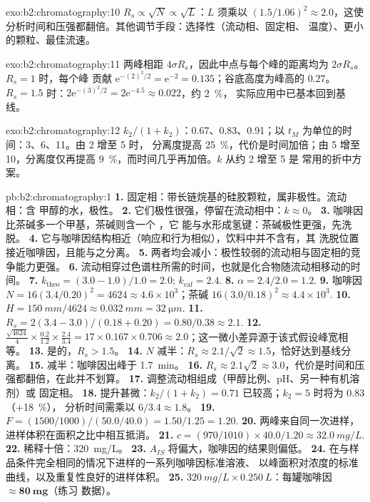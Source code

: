 \begin{solution}{exo:b2:chromatography:10}
$R_s \propto \sqrt N \propto \sqrt L$：$L$ 须乘以 $(1.5/1.06)^2 \approx 2.0$，这使
分析时间和压强都翻倍。其他调节手段：选择性（流动相、固定相、
温度）、更小的颗粒、最佳流速。
\end{solution}

\begin{solution}{exo:b2:chromatography:11}
两峰相距 $4\sigma R_s$，因此中点与每个峰的距离均为 $2\sigma R_s$。$R_s = 1$ 时，每个峰
贡献 $\mathrm e^{-(2)^2/2} = \mathrm e^{-2} = 0.135$；谷底高度为峰高的 $0.27$。
$R_s = 1.5$ 时：$2\mathrm e^{-(3)^2/2} = 2\mathrm e^{-4.5} \approx 0.022$，约 2~\%，
实际应用中已基本回到基线。
\end{solution}

\begin{solution}{exo:b2:chromatography:12}
$k_2/(1+k_2)$：0.67、0.83、0.91；以 $t_M$ 为单位的时间：3、6、11。由 2 增至 5 时，
分离度提高 25~\%，代价是时间加倍；由 5 增至 10，分离度仅再提高 9~\%，而时间几乎再加倍。$k$ 从约 2 增至 5 是
常用的折中方案。
\end{solution}

\begin{solution}{pb:b2:chromatography:1}
\textbf{1.} 固定相：带长链烷基的硅胶颗粒，属非极性。流动相：含
甲醇的水，极性。
\textbf{2.} 它们极性很强，停留在流动相中：$k \approx 0$。
\textbf{3.} 咖啡因比茶碱多一个甲基，茶碱则含一个 ，它
能与水形成氢键：茶碱极性更强，先洗脱。
\textbf{4.} 它与咖啡因结构相近（响应和行为相似），饮料中并不含有，其
洗脱位置接近咖啡因，且能与之分离。
\textbf{5.} 两者均会减小：极性较弱的流动相与固定相的竞争能力更强。
\textbf{6.} 流动相穿过色谱柱所需的时间，也就是化合物随流动相移动的时间。
\textbf{7.} $k_{\mathrm{theo}} = (3.0 - 1.0)/1.0 = 2.0$; $k_{\mathrm{caf}} = 2.4$.
\textbf{8.} $\alpha = 2.4/2.0 = 1.2$.
\textbf{9.} 咖啡因 $N = 16(3.4/0.20)^2 = 4624 \approx 4.6 \times 10^3$；茶碱 $16(3.0/0.18)^2
\approx 4.4 \times 10^3$.
\textbf{10.} $H = \qty{150}{mm}/4624 \approx \qty{0.032}{mm} = \qty{32}{\micro m}$.
\textbf{11.} $R_s = 2(3.4 - 3.0)/(0.18 + 0.20) = 0.80/0.38 \approx 2.1$.
\textbf{12.} $\frac{\sqrt{4624}}{4} \times \frac{0.2}{1.2} \times \frac{2.4}{3.4} = 17 \times 0.167 \times
0.706 \approx 2.0$；这一微小差异源于该式假设峰宽相等。
\textbf{13.} 是的，$R_s > 1.5$。
\textbf{14.} $N$ 减半：$R_s \approx 2.1/\sqrt2 \approx 1.5$，恰好达到基线分离。
\textbf{15.} 减半：咖啡因出峰于 \qty{1.7}{min}。
\textbf{16.} $R_s \approx 2.1\sqrt2 \approx 3.0$，代价是时间和压强都翻倍，在此并不划算。
\textbf{17.} 调整流动相组成（甲醇比例、pH、另一种有机溶剂）或
固定相。
\textbf{18.} 提升甚微：$k_2/(1 + k_2) = 0.71$ 已较高；$k_2 = 5$ 时将为 0.83（+18~\%），
分析时间需乘以 $6/3.4 \approx 1.8$。
\textbf{19.} $F = (1500/1000)/(50.0/40.0) = 1.50/1.25 = 1.20$.
\textbf{20.} 两峰来自同一次进样，进样体积在面积之比中相互抵消。
\textbf{21.} $c = (970/1010) \times 40.0/1.20 \approx \qty{32.0}{mg/L}$.
\textbf{22.} 稀释十倍：\qty{320}{mg/L}。
\textbf{23.} $A_{IS}$ 将偏大，咖啡因的结果则偏低。
\textbf{24.} 在与样品条件完全相同的情况下进样的一系列咖啡因标准溶液、
以峰面积对浓度的标准曲线，以及重复性良好的进样体积。
\textbf{25.} $\qty{320}{mg/L} \times \qty{0.250}{L}$：每罐咖啡因 $\boldsymbol{\approx \qty{80}{mg}}$（练习
数据）。
\end{solution}
